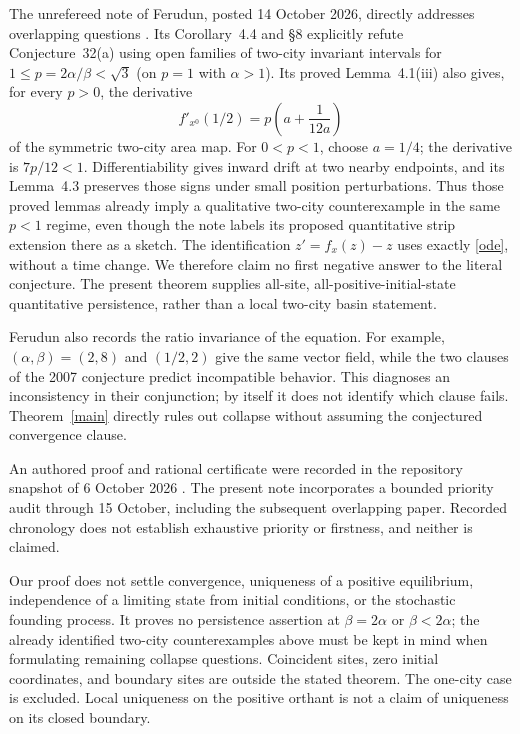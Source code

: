 \documentclass[11pt]{article}
\begin{document}
The unrefereed note of Ferudun, posted 14 October 2026, directly addresses overlapping questions \cite{Fer26}. Its Corollary~4.4 and \S8 explicitly refute Conjecture~32(a) using open families of two-city invariant intervals for $1\leq p=2\alpha/\beta<\sqrt3$ (on $p=1$ with $\alpha>1$). Its proved Lemma~4.1(iii) also gives, for every $p>0$, the derivative
\[
 f'_{x^0}(1/2)=p\left(a+\frac1{12a}\right)
\]
of the symmetric two-city area map. For $0<p<1$, choose $a=1/4$; the derivative is $7p/12<1$. Differentiability gives inward drift at two nearby endpoints, and its Lemma~4.3 preserves those signs under small position perturbations. Thus those proved lemmas already imply a qualitative two-city counterexample in the same $p<1$ regime, even though the note labels its proposed quantitative strip extension there as a sketch. The identification $z'=f_x(z)-z$ uses exactly \eqref{ode}, without a time change. We therefore claim no first negative answer to the literal conjecture. The present theorem supplies all-site, all-positive-initial-state quantitative persistence, rather than a local two-city basin statement.

Ferudun also records the ratio invariance of the equation. For example, $(\alpha,\beta)=(2,8)$ and $(1/2,2)$ give the same vector field, while the two clauses of the 2007 conjecture predict incompatible behavior. This diagnoses an inconsistency in their conjunction; by itself it does not identify which clause fails. Theorem~\ref{main} directly rules out collapse without assuming the conjectured convergence clause.

An authored proof and rational certificate were recorded in the repository snapshot of 6 October 2026 \cite{Kri26}. The present note incorporates a bounded priority audit through 15 October, including the subsequent overlapping paper. Recorded chronology does not establish exhaustive priority or firstness, and neither is claimed.

Our proof does not settle convergence, uniqueness of a positive equilibrium, independence of a limiting state from initial conditions, or the stochastic founding process. It proves no persistence assertion at $\beta=2\alpha$ or $\beta<2\alpha$; the already identified two-city counterexamples above must be kept in mind when formulating remaining collapse questions. Coincident sites, zero initial coordinates, and boundary sites are outside the stated theorem. The one-city case is excluded. Local uniqueness on the positive orthant is not a claim of uniqueness on its closed boundary.
\end{document}
